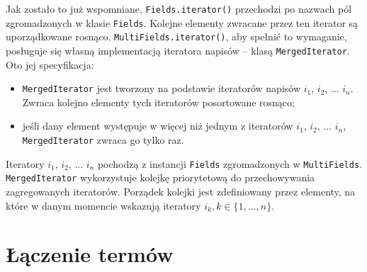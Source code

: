 Jak zostało to już wspomniane, \texttt{Fields.iterator()} przechodzi po nazwach pól zgromadzonych w klasie \texttt{Fields}. Kolejne elementy zwracane przez ten iterator są uporządkowane rosnąco. \texttt{MultiFields.iterator()}, aby spełnić to wymaganie, posługuje się własną implementacją iteratora napisów -- klasą \texttt{MergedIterator}. Oto jej specyfikacja:
\begin{itemize}
 \item \texttt{MergedIterator} jest tworzony na podstawie iteratorów napisów $i_1$, $i_2$, ... $i_n$. Zwraca kolejno elementy tych iteratorów posortowane rosnąco; 
 \item jeśli dany element występuje w więcej niż jednym z iteratorów $i_1$, $i_2$, ... $i_n$, \texttt{MergedIterator} zwraca go tylko raz.
\end{itemize}
Iteratory $i_1$, $i_2$, ... $i_n$ pochodzą z instancji \texttt{Fields} zgromadzonych w \texttt{MultiFields}. \texttt{MergedIterator} wykorzystuje kolejkę priorytetową do przechowywania zagregowanych iteratorów. Porządek kolejki jest zdefiniowany przez elementy, na które w danym momencie wskazują iteratory $i_k, k \in \{1, ..., n\}$.

\section{Łączenie termów}

